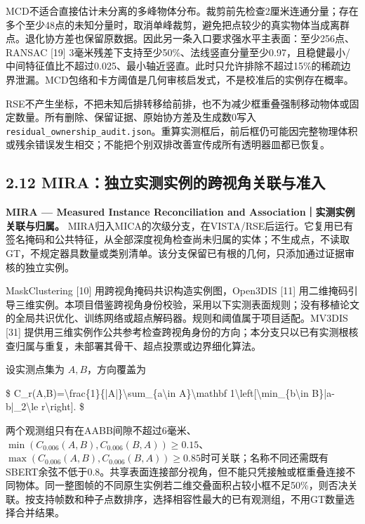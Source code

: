 \documentclass[UTF8,fontset=fandol]{ctexart}
\begin{document}
MCD不适合直接估计未分离的多峰物体分布。裁剪前先检查2厘米连通分量；存在多个至少48点的未知分量时，取消单峰裁剪，避免把点较少的真实物体当成离群点。退化协方差也保留原数据。因此另一条入口要求强水平主表面：至少256点、RANSAC [19] 3毫米残差下支持至少50\%、法线竖直分量至少0.97，且稳健最小/中间特征值比不超过0.025、最小轴近竖直。此时只允许排除不超过15\%的稀疏边界泄漏。MCD包络和卡方阈值是几何审核启发式，不是校准后的实例存在概率。



RSE不产生坐标，不把未知后排转移给前排，也不为减少框重叠强制移动物体或固定数量。所有删除、保留证据、原始协方差及生成数0写入\texttt{residual\_\allowbreak{}ownership\_\allowbreak{}audit.\allowbreak{}json}。重算实测框后，前后框仍可能因完整物理体积或残余错误发生相交；不能把个别双排改善宣传成所有透明器皿都已恢复。



\subsection*{2.12 MIRA：独立实测实例的跨视角关联与准入}

\textbf{MIRA — Measured Instance Reconciliation and Association｜实测实例关联与归属。} MIRA归入MICA的次级分支，在VISTA/RSE后运行。它复用已有签名掩码和公共特征，从全部深度视角检查尚未归属的实体；不生成点，不读取GT，不规定器具数量或类别清单。该分支保留已有根的几何，只添加通过证据审核的独立实例。



MaskClustering [10] 用跨视角掩码共识构造实例图，Open3DIS [11] 用二维掩码引导三维实例。本项目借鉴跨视角身份校验，采用以下实测表面规则；没有移植论文的全局共识优化、训练网络或超点解码器。规则和阈值属于项目适配。MV3DIS [31] 提供用三维实例作公共参考检查跨视角身份的方向；本分支只以已有实测根核查归属与重复，未部署其骨干、超点投票或边界细化算法。



设实测点集为 $A,B$，方向覆盖为



\$
C\_r(A,B)=\textbackslash{}frac\{1\}\{|A|\}\textbackslash{}sum\_\{a\textbackslash{}in A\}\textbackslash{}mathbf 1\textbackslash{}left[\textbackslash{}min\_\{b\textbackslash{}in B\}|a-b|\_2\textbackslash{}le r\textbackslash{}right].
\$



两个观测组只有在AABB间隙不超过6毫米、$\min(C_{0.006}(A,B),C_{0.006}(B,A))\ge0.15$、$\max(C_{0.006}(A,B),C_{0.006}(B,A))\ge0.85$时可关联；名称不同还需既有SBERT余弦不低于0.8。共享表面连接部分视角，但不能只凭接触或框重叠连接不同物体。同一整图帧的不同原生实例若二维交叠面积占较小框不足50\%，则否决关联。按支持帧数和种子点数排序，选择相容性最大的已有观测组，不用GT数量选择合并结果。
\end{document}
